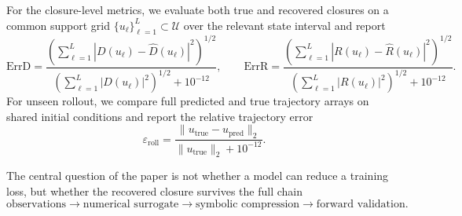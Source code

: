 For the closure-level metrics, we evaluate both true and recovered closures on a common support grid $\{u_\ell\}_{\ell=1}^L \subset \mathcal{U}$ over the relevant state interval and report
\begin{equation}
\mathrm{ErrD} =
\frac{\left(\sum_{\ell=1}^{L} |D(u_\ell)-\widehat{D}(u_\ell)|^2 \right)^{1/2}}
{\left(\sum_{\ell=1}^{L} |D(u_\ell)|^2 \right)^{1/2} + 10^{-12}},
\qquad
\mathrm{ErrR} =
\frac{\left(\sum_{\ell=1}^{L} |R(u_\ell)-\widehat{R}(u_\ell)|^2 \right)^{1/2}}
{\left(\sum_{\ell=1}^{L} |R(u_\ell)|^2 \right)^{1/2} + 10^{-12}}.
\end{equation}
For unseen rollout, we compare full predicted and true trajectory arrays on shared initial conditions and report the relative trajectory error
\begin{equation}
\varepsilon_{\mathrm{roll}}
=
\frac{\|u_{\mathrm{true}}-u_{\mathrm{pred}}\|_{2}}
{\|u_{\mathrm{true}}\|_{2}+10^{-12}}.
\end{equation}

The central question of the paper is not whether a model can reduce a training loss, but whether the recovered closure survives the full chain
\begin{equation}
\text{observations} \rightarrow \text{numerical surrogate} \rightarrow \text{symbolic compression} \rightarrow \text{forward validation}.
\end{equation}

